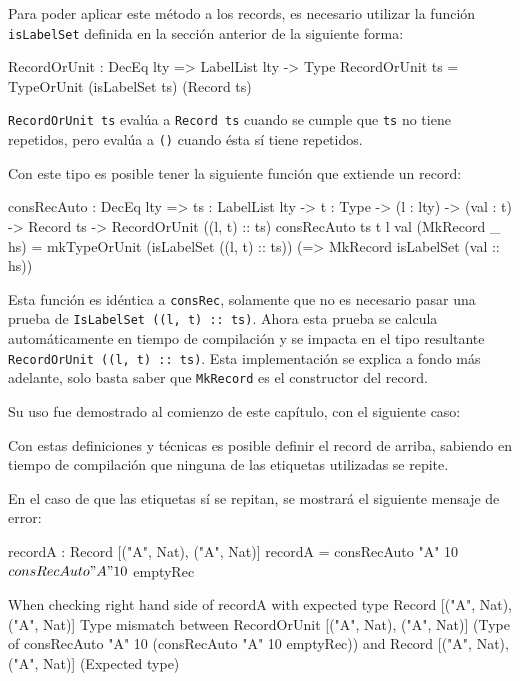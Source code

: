Para poder aplicar este método a los records, es necesario utilizar la función \texttt{isLabelSet} definida en la sección anterior de la siguiente forma:

\begin{code}
RecordOrUnit : DecEq lty => LabelList lty -> Type
RecordOrUnit ts = TypeOrUnit (isLabelSet ts) (Record ts)
\end{code}

\texttt{RecordOrUnit ts} evalúa a \texttt{Record ts} cuando se cumple que \texttt{ts} no tiene repetidos, pero evalúa a \texttt{()} cuando ésta sí tiene repetidos.

Con este tipo es posible tener la siguiente función que extiende un record:

\begin{code}
consRecAuto : DecEq lty => {ts : LabelList lty} ->
  {t : Type} -> (l : lty) -> (val : t) -> Record ts ->
  RecordOrUnit ((l, t) :: ts)
consRecAuto {ts} {t} l val (MkRecord _ hs) =
  mkTypeOrUnit (isLabelSet ((l, t) :: ts))
  (\isLabelSet => MkRecord isLabelSet (val :: hs))
\end{code}

Esta función es idéntica a \texttt{consRec}, solamente que no es necesario pasar una prueba de \texttt{IsLabelSet ((l, t) :: ts)}. Ahora esta prueba se calcula automáticamente en tiempo de compilación y se impacta en el tipo resultante \texttt{RecordOrUnit ((l, t) :: ts)}. Esta implementación se explica a fondo más adelante, solo basta saber que \texttt{MkRecord} es el constructor del record.

Su uso fue demostrado al comienzo de este capítulo, con el siguiente caso:


Con estas definiciones y técnicas es posible definir el record de arriba, sabiendo en tiempo de compilación que ninguna de las etiquetas utilizadas se repite.

En el caso de que las etiquetas sí se repitan, se mostrará el siguiente mensaje de error:

\begin{code}
recordA : Record [("A", Nat), ("A", Nat)]
recordA = consRecAuto "A" 10 $
  consRecAuto "A" 10 $
  emptyRec

When checking right hand side of recordA with expected type
    Record [("A", Nat), ("A", Nat)]
  Type mismatch between
    RecordOrUnit [("A", Nat), ("A", Nat)]
      (Type of consRecAuto "A" 10
        (consRecAuto "A" 10 emptyRec))
  and
    Record [("A", Nat), ("A", Nat)] (Expected type)
\end{code}

